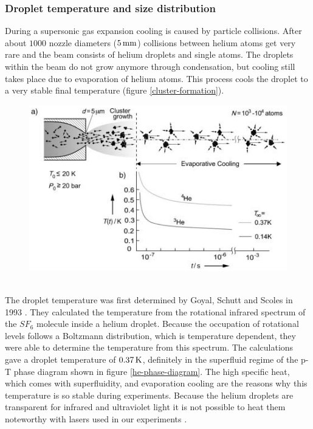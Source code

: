 \documentclass[parskip,12pt,headsepline,a4paper] {scrbook}
\begin{document}
\subsubsection{Droplet temperature and size distribution}
\vspace{-1\baselineskip}
During a supersonic gas expansion cooling is caused by particle collisions. After about $1000$ nozzle diameters ($\unit[5]{mm}$) collisions between helium atoms get very rare and the beam consists of helium droplets and single atoms. The droplets within the beam do not grow anymore through condensation, but cooling still takes place due to evaporation of helium atoms. This process cools the droplet to a very stable final temperature (figure \ref{cluster-formation}).
\begin{figure}[ht]
\centerline{
\includegraphics[width=12cm]{./expansion/cluster-formation.jpg}}
\end{figure}\\
The droplet temperature was first determined by Goyal, Schutt and Scoles in 1993 \cite{he-temp}. They calculated the temperature from the rotational infrared spectrum of the $SF_6$ molecule inside a helium droplet. Because the occupation of rotational levels follows a Boltzmann distribution, which is temperature dependent, they were able to determine the temperature from this spectrum. The calculations gave a droplet temperature of $\unit[0.37]{K}$, definitely in the superfluid regime of the p-T phase diagram shown in figure \ref{he-phase-diagram}. The high specific heat, which comes with superfluidity, and evaporation cooling are the reasons why this temperature is so stable during experiments. Because the helium droplets are transparent for infrared and ultraviolet light it is not possible to heat them noteworthy with lasers used in our experiments \cite{laser-heating}.
\end{document}
